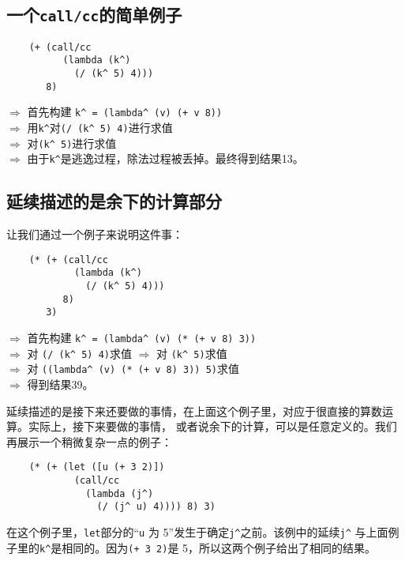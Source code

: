 \documentclass[12pt]{article}
\begin{document}
\subsection{一个\texttt{call/cc}的简单例子}
\begin{verbatim}
    (+ (call/cc
          (lambda (k^)
            (/ (k^ 5) 4)))
       8)
\end{verbatim}
$\Longrightarrow$ 首先构建 \texttt{k\^{} = (lambda\^{} (v) (+ v 8))}\\
$\Longrightarrow$ 用\texttt{k\^{}}对\texttt{(/ (k\^{} 5) 4)}进行求值\\
$\Longrightarrow$ 对\texttt{(k\^{} 5)}进行求值\\
$\Longrightarrow$ 由于\texttt{k\^{}}是逃逸过程，除法过程被丢掉。最终得到结果13。

\subsection{延续描述的是余下的计算部分}
\noindent{}让我们通过一个例子来说明这件事：
\begin{verbatim}
    (* (+ (call/cc
            (lambda (k^)
              (/ (k^ 5) 4)))
          8)
       3)
\end{verbatim}
$\Longrightarrow$ 首先构建 \texttt{k\^{} = (lambda\^{} (v) (* (+ v 8) 3))}\\
$\Longrightarrow$ 对 \texttt{(/ (k\^{} 5) 4)}求值
$\Rightarrow$ 对 \texttt{(k\^{} 5)}求值\\
$\Longrightarrow$ 对 \texttt{((lambda\^{} (v) (* (+ v 8) 3)) 5)}求值\\
$\Longrightarrow$ 得到结果39。

\vspace{0.5em}
\noindent{}延续描述的是接下来还要做的事情，在上面这个例子里，对应于很直接的算数运算。实际上，接下来要做的事情，
或者说余下的计算，可以是任意定义的。我们再展示一个稍微复杂一点的例子：
\begin{verbatim}
    (* (+ (let ([u (+ 3 2)])
            (call/cc
              (lambda (j^)
                (/ (j^ u) 4)))) 8) 3)
\end{verbatim}
\noindent{}在这个例子里，\texttt{let}部分的``\texttt{u} 为 5''发生于确定\texttt{j\^{}}之前。该例中的延续\texttt{j\^{}}
与上面例子里的\texttt{k\^{}}是相同的。因为\texttt{(+ 3 2)}是 5，所以这两个例子给出了相同的结果。
\end{document}
